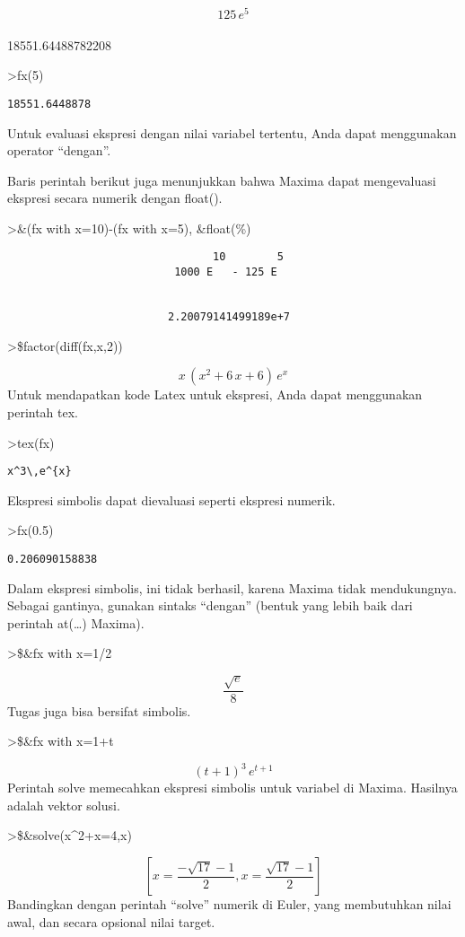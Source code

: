 \documentclass[
]{book}
\begin{document}
\[125\,e^5\]\\
18551.64488782208

\textgreater fx(5)

\begin{verbatim}
18551.6448878
\end{verbatim}

Untuk evaluasi ekspresi dengan nilai variabel tertentu, Anda dapat menggunakan operator ``dengan''.

Baris perintah berikut juga menunjukkan bahwa Maxima dapat mengevaluasi ekspresi secara numerik dengan float().

\textgreater\&(fx with x=10)-(fx with x=5), \&float(\%)

\begin{verbatim}
                                10        5
                          1000 E   - 125 E


                         2.20079141499189e+7
\end{verbatim}

\textgreater\$factor(diff(fx,x,2))

\[x\,\left(x^2+6\,x+6\right)\,e^{x}\]Untuk mendapatkan kode Latex untuk ekspresi, Anda dapat menggunakan perintah tex.

\textgreater tex(fx)

\begin{verbatim}
x^3\,e^{x}
\end{verbatim}

Ekspresi simbolis dapat dievaluasi seperti ekspresi numerik.

\textgreater fx(0.5)

\begin{verbatim}
0.206090158838
\end{verbatim}

Dalam ekspresi simbolis, ini tidak berhasil, karena Maxima tidak mendukungnya. Sebagai gantinya, gunakan sintaks ``dengan'' (bentuk yang lebih baik dari perintah at(\ldots) Maxima).

\textgreater\$\&fx with x=1/2

\[\frac{\sqrt{e}}{8}\]Tugas juga bisa bersifat simbolis.

\textgreater\$\&fx with x=1+t

\[\left(t+1\right)^3\,e^{t+1}\]Perintah solve memecahkan ekspresi simbolis untuk variabel di Maxima. Hasilnya adalah vektor solusi.

\textgreater\$\&solve(x\^{}2+x=4,x)

\[\left[ x=\frac{-\sqrt{17}-1}{2} , x=\frac{\sqrt{17}-1}{2} \right]\]Bandingkan dengan perintah ``solve'' numerik di Euler, yang membutuhkan nilai awal, dan secara opsional nilai target.
\end{document}
